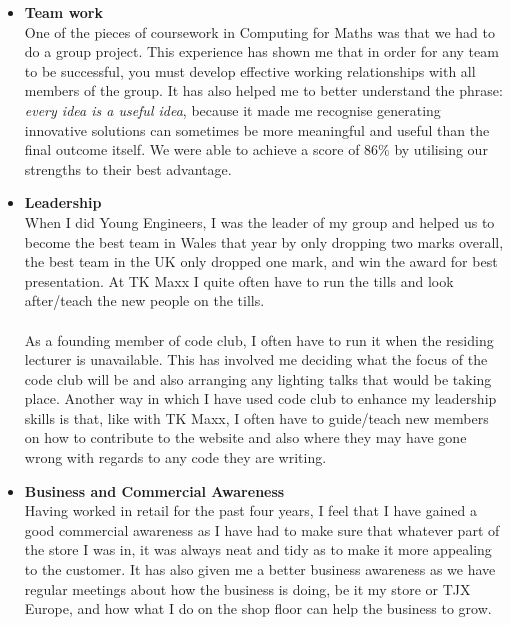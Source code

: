 \documentclass[a4paper]{res}
\begin{document}
\begin{resume}
\begin{itemize}
\item \textbf{Team work} \\
One of the pieces of coursework in Computing for Maths was that we had to do a
group project. This experience has shown me that in order for any team to be
successful, you must develop effective working relationships with all members of
the group. It has also helped me to better understand the phrase: 
\textit{every idea is a useful idea}, because it made me recognise generating
innovative solutions can sometimes be more meaningful and useful than the final
outcome itself. We were able to achieve a score of 86\% by utilising our
strengths to their best advantage. \\


\item \textbf{Leadership} \\
When I did Young Engineers, I was the leader of my group and helped us to become
the best team in Wales that year by only dropping two marks overall, the best
team in the UK only dropped one mark, and win the award for best presentation.
At TK Maxx I quite often have to run the tills and look after/teach the new
people on the tills. \\
\\
As a founding member of code club, I often have to run it when the residing
lecturer is unavailable. This has involved me deciding what the focus of the
code club will be and also arranging any lighting talks that would be taking
place. Another way in which I have used code club to enhance my leadership
skills is that, like with TK Maxx, I often have to guide/teach new members on
how to contribute to the website and also where they may have gone wrong with
regards to any code they are writing. \\

\item \textbf{Business and Commercial Awareness} \\
Having worked in retail for the past four years, I feel that I have gained a
good commercial awareness as I have had to make sure that whatever part of the
store I was in, it was always neat and tidy as to make it more appealing to the
customer. It has also given me a better business awareness as we have regular
meetings about how the business is doing, be it my store or TJX Europe, and how
what I do on the shop floor can help the business to grow.
\end{itemize}


\end{resume}
\end{document}

